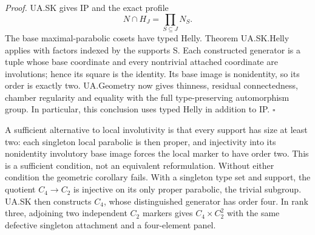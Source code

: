 \emph{Proof.} UA.SK gives IP and the exact profile \[
 N\cap H_J=\prod_{S\subseteq J}N_S.
\] The base maximal-parabolic cosets have typed Helly. Theorem
UA.SK.Helly applies with factors indexed by the supports S. Each
constructed generator is a tuple whose base coordinate and every
nontrivial attached coordinate are involutions; hence its square is the
identity. Its base image is nonidentity, so its order is exactly two.
UA.Geometry now gives thinness, residual connectedness, chamber
regularity and equality with the full type-preserving automorphism
group. In particular, this conclusion uses typed Helly in addition to
IP. \(\square\)

A sufficient alternative to local involutivity is that every support has
size at least two: each singleton local parabolic is then proper, and
injectivity into its nonidentity involutory base image forces the local
marker to have order two. This is a sufficient condition, not an
equivalent reformulation. Without either condition the geometric
corollary fails. With a singleton type set and support, the quotient
\(C_4\to C_2\) is injective on its only proper parabolic, the trivial
subgroup. UA.SK then constructs \(C_4\), whose distinguished generator
has order four. In rank three, adjoining two independent \(C_2\) markers
gives \(C_4\times C_2^2\) with the same defective singleton attachment
and a four-element panel.
